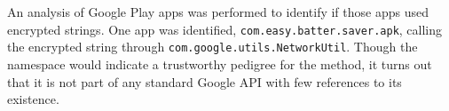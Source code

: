 An analysis of Google Play apps was performed to identify if those apps used
encrypted strings.  One app was identified, \texttt{com.easy.batter.saver.apk},
calling the encrypted string through \texttt{com.google.utils.NetworkUtil}.
Though the namespace would indicate a trustworthy pedigree for the method, it
turns out that it is not part of any standard Google API with few references to
its existence.

